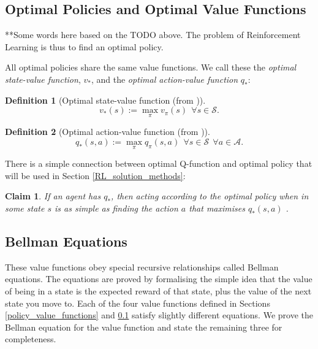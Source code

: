 \documentclass[11pt, a4paper, bibliography=totoc]{report}
\newtheorem{claim}{Claim}
\newtheorem{definition}{Definition}
\begin{document}
\subsection{Optimal Policies and Optimal Value Functions} \label{optimal_policy_value_functions}
**Some words here based on the TODO above.
The problem of Reinforcement Learning is thus to find an optimal policy.

All optimal policies share the same value functions. We call these the \textit{optimal state-value function}, $ v_* $, and the \textit{optimal action-value function} $ q_* $:
\begin{definition}[Optimal state-value function (from {\cite[p.~62]{Sutton2018}})]
	$$ v_*(s)  := \max_\pi v_\pi(s) ~~ \forall s \in \mathcal{S} .$$
\end{definition}
\begin{definition}[Optimal action-value function (from {\cite[p.~63]{Sutton2018}})]
	$$ q_*(s,a)  := \max_\pi q_\pi(s,a) ~~ \forall s \in \mathcal{S} ~~ \forall a \in \mathcal{A} .$$
\end{definition}

There is a simple connection between optimal Q-function and optimal policy that will be used in Section \ref{RL_solution_methods}:
\begin{claim} \label{Q_claim}
	If an agent has $ q_* $, then acting according to the optimal policy when in some state $ s $ is as simple as finding the action $ a $ that maximises $ q_*(s,a) $ \cite[p.~64]{Sutton2018}.
\end{claim}

\subsection{Bellman Equations}
These value functions obey special recursive relationships called Bellman equations. The equations are proved by formalising the simple idea that the value of being in a state is the expected reward of that state, plus the value of the next state you move to. Each of the four value functions defined in Sections \ref{policy_value_functions} and \ref{optimal_policy_value_functions} satisfy slightly different equations. We prove the Bellman equation for the value function and state the remaining three for completeness.
\end{document}
